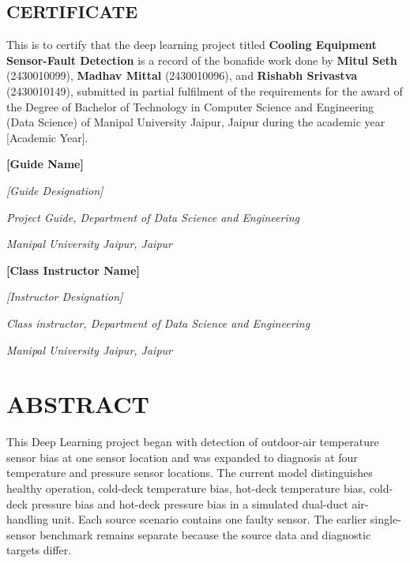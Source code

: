 \begin{EditableCertificate}

\section*{CERTIFICATE}

This is to certify that the deep learning project titled
\textbf{Cooling Equipment Sensor-Fault Detection} is a record of the bonafide work done by
\textbf{Mitul Seth} (2430010099),
\textbf{Madhav Mittal} (2430010096), and
\textbf{Rishabh Srivastva} (2430010149), submitted in partial
fulfilment of the requirements for the award of the Degree of Bachelor
of Technology in Computer Science and Engineering (Data Science) of
Manipal University Jaipur, Jaipur during the academic year [Academic Year].

\vspace{42bp}

\begin{FacultyDetails}
\begin{flushleft}

\textbf{[Guide Name]}

\textit{[Guide Designation]}

\textit{Project Guide, Department of Data Science and Engineering}

\textit{Manipal University Jaipur, Jaipur}

\vspace{60bp}

\textbf{[Class Instructor Name]}

\textit{[Instructor Designation]}

\textit{Class instructor, Department of Data Science and Engineering}

\textit{Manipal University Jaipur, Jaipur}

\end{flushleft}
\end{FacultyDetails}
\end{EditableCertificate}

\section*{ABSTRACT}
This Deep Learning project began with detection of outdoor-air temperature sensor bias at one sensor location and was expanded to diagnosis at four temperature and pressure sensor locations. The current model distinguishes healthy operation, cold-deck temperature bias, hot-deck temperature bias, cold-deck pressure bias and hot-deck pressure bias in a simulated dual-duct air-handling unit. Each source scenario contains one faulty sensor. The earlier single-sensor benchmark remains separate because the source data and diagnostic targets differ.

